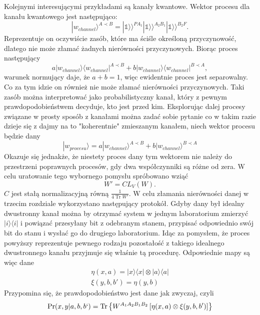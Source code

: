 \documentclass[10pt]{article} %
\DeclareMathOperator{\Trs}{Tr}
\newcommand{\Ket}[1]{|#1\rangle}
\newcommand{\Bra}[1]{\langle#1|}
\newcommand{\KKet}[1]{|#1\rangle\rangle}
\newcommand{\WAll}{W^{A_1A_2B_1B_2}}
\newcommand{\I}{\mathbb{1}}
\begin{document}
Kolejnymi interesującymi przykładami są kanały kwantowe. Wektor procesu dla kanału kwantowego jest następująco:
\begin{equation}
\Ket{w_{channel}}^{A \prec B} = \KKet{\I}^{PA_1}\KKet{\I}^{A_2B_1}\KKet{\I}^{B_2F}.
\end{equation}
Reprezentuje on oczywiście zasób, które ma ściśle określoną przyczynowość, dlatego nie może złamać żadnych nierówności przyczynowych.
Biorąc proces następujący
\begin{equation}
a\Ket{w_{channel}}\Bra{w_{channel}}^{A \prec B} + b\Ket{w_{channel}}\Bra{w_{channel}}^{B \prec A},
\end{equation} warunek normujący daje, że $a+b=1$, więc ewidentnie proces jest separowalny. Co za tym idzie on również nie może złamać nierówności przyczynowych. Taki zasób można interpretować jako probabilistyczny kanał, który z pewnym prawdopodobieństwem decyduje, kto jest przed kim.
Eksplorując dalej procesy związane w prosty sposób z kanałami można zadać sobie pytanie co w takim razie dzieje się z dajmy na to "koherentnie" zmieszanym kanałem, niech wektor procesu będzie dany
\begin{equation}
\Ket{w_{procesu}} = a\Ket{w_{channel}}^{A \prec B} + b\Ket{w_{channel}}^{B \prec A}
\end{equation}
Okazuje się jednakże, że niestety proces dany tym wektorem nie należy do przestrzeni poprawnych procesów, gdy dwa współczynniki są różne od zera. W celu uratowanie tego wybornego pomysłu spróbowano wziąć 
\begin{equation}
W' = CL_V(W).
\end{equation}
$C$ jest stałą normalizacyjną równą $\frac{1}{4\Trs W'}$.
W celu złamania nierówności danej w trzecim rozdziale wykorzystano następujący protokół. Gdyby dany był idealny dwustronny kanał można by otrzymać system w jednym laboratorium zmierzyć $\Ket{i}\Bra{i}$ i powiązać przesyłany bit z odebranym stanem, przypisać odpowiednio swój bit do stanu i wysłać go do drugiego laboratorium. Idąc za pomysłem, że proces powyższy reprezentuje pewnego rodzaju pozostałość z takiego idealnego dwustronnego kanału przyjmuje się właśnie tą procedurę. Odpowiednie mapy są więc dane
\begin{gather}
\eta(x,a) = \Ket{x}\Bra{x} \otimes \Ket{a}\Bra{a} \\
\xi(y,b,b') = \eta(y,b)
\end{gather}
Przypomina się, że prawdopodobieństwo jest dane jak zwyczaj, czyli
\begin{equation}
\Pr(x,y|a,b,b`) = \Trs\left\{{\WAll\left[\eta(x,a) \otimes \xi(y,b,b') \right]}\right\}
\end{equation}
\end{document}
